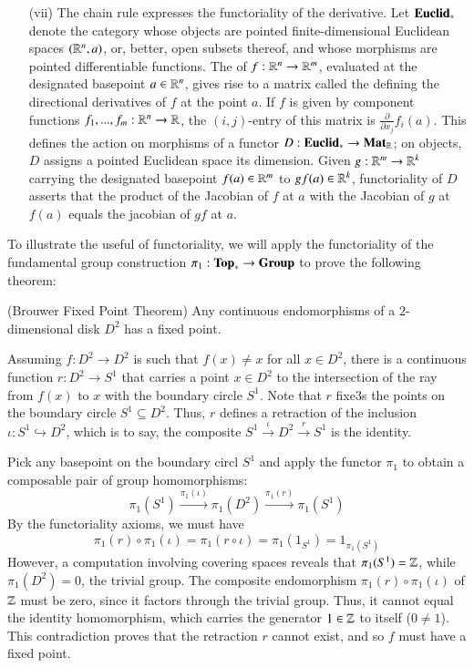 \documentclass[12pt]{report}
\begin{document}
\begin{eg}{}{}
\begin{enumerate}
        \item[(vii)] The chain rule expresses the functoriality of the derivative. Let $\normalfont\textbf{Euclid}_*$ denote the category whose objects are pointed finite-dimensional Euclidean spaces $(\mathbb R^n,a)$, or, better, open subsets thereof, and whose morphisms are pointed differentiable functions. The  of $f:\mathbb R^n\rightarrow \mathbb R^m$, evaluated at the designated basepoint $a \in \mathbb R^n$, gives rise to a matrix called the  defining the directional derivatives of $f$ at the point $a$. If $f$ is given by component functions $f_1,...,f_m:\mathbb R^n\rightarrow \mathbb R$, the $(i,j)$-entry of this matrix is $\frac{\partial}{\partial x_j}f_i(a)$. This defines the action on morphisms of a functor $D:\normalfont\textbf{Euclid}_*\rightarrow \normalfont\textbf{Mat}_{\mathbb R}$; on objects, $D$ assigns a pointed Euclidean space its dimension. Given $g:\mathbb R^m\rightarrow \mathbb R^k$ carrying the designated basepoint $f(a) \in \mathbb R^m$ to $gf(a) \in \mathbb R^k$, functoriality of $D$ asserts that the product of the Jacobian of $f$ at $a$ with the Jacobian of $g$ at $f(a)$ equals the jacobian of $gf$ at $a$.
    \end{enumerate}
\end{eg}

To illustrate the useful of functoriality, we will apply the functoriality of the fundamental group construction $\pi_1:\normalfont\textbf{Top}_*\rightarrow \normalfont\textbf{Group}$ to prove the following theorem: 

\begin{thm}{(Brouwer Fixed Point Theorem)}{}
    Any continuous endomorphisms of a $2$-dimensional disk $D^2$ has a fixed point.
\end{thm}
\begin{proof*}{}{}
    Assuming $f:D^2\rightarrow D^2$ is such that $f(x) \neq x$ for all $x \in D^2$, there is a continuous function $r:D^2\rightarrow S^1$ that carries a point $x \in D^2$ to the intersection of the ray from $f(x)$ to $x$ with the boundary circle $S^1$. Note that $r$ fixe3s the points on the boundary circle $S^1\subseteq D^2$. Thus, $r$ defines a retraction of the inclusion $\iota:S^1\hookrightarrow D^2$, which is to say, the composite $S^1\xrightarrow{\iota} D^2\xrightarrow{r}S^1$ is the identity. 

    Pick any basepoint on the boundary circl $S^1$ and apply the functor $\pi_1$ to obtain a composable pair of group homomorphisms: \begin{equation*}
        \pi_1(S^1)\xrightarrow{\pi_1(\iota)}\pi_1(D^2)\xrightarrow{\pi_1(r)}\pi_1(S^1)
    \end{equation*}
    By the functoriality axioms, we must have $$\pi_1(r)\circ\pi_1(\iota) = \pi_1(r\circ\iota) = \pi_1(1_{S^1}) = 1_{\pi_1(S^1)}$$
    However, a computation involving covering spaces reveals that $\pi_1(S^1) = \mathbb Z$, while $\pi_1(D^2) = 0$, the trivial group. The composite endomorphism $\pi_1(r)\circ \pi_1(\iota)$ of $\mathbb Z$ must be zero, since it factors through the trivial group. Thus, it cannot equal the identity homomorphism, which carries the generator $1 \in \mathbb Z$ to itself ($0 \neq 1$). This contradiction proves that the retraction $r$ cannot exist, and so $f$ must have a fixed point.
\end{proof*}
\end{document}
